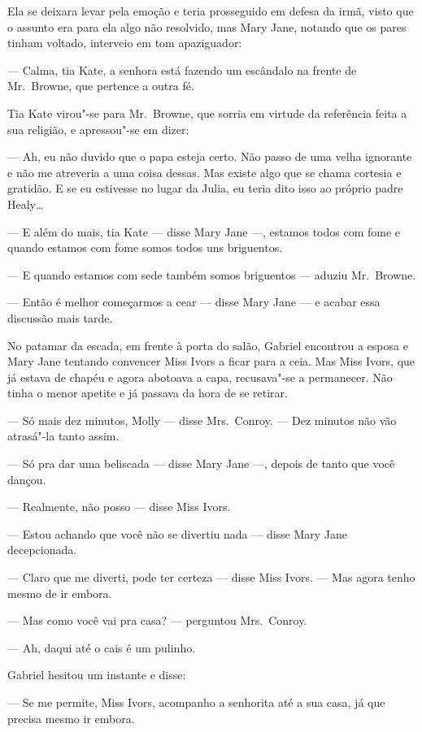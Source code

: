 Ela se deixara levar pela emoção e teria prosseguido em defesa da irmã, visto
que o assunto era para ela algo não resolvido, mas Mary Jane, notando que os
pares tinham voltado, interveio em tom apaziguador:

--- Calma, tia Kate, a senhora está fazendo um escândalo na frente de 
Mr.~Browne, que pertence a outra fé.

Tia Kate virou"-se para Mr.~Browne, que sorria em virtude da referência feita a
sua religião, e apressou"-se em dizer:

--- Ah, eu não duvido que o papa esteja certo.  Não passo de uma velha
ignorante e não me atreveria a uma coisa dessas.  Mas existe algo que se chama
cortesia e gratidão.  E se eu estivesse no lugar da Julia, eu teria dito isso
ao próprio padre Healy\ldots{}

--- E além do mais, tia Kate --- disse Mary Jane ---, estamos todos com fome e
quando estamos com fome somos todos uns briguentos.

--- E quando estamos com sede também somos briguentos --- aduziu Mr.~Browne.

--- Então é melhor começarmos a cear --- disse Mary Jane --- e acabar essa
discussão mais tarde.

No patamar da escada, em frente à porta do salão, Gabriel encontrou a esposa e
Mary Jane tentando convencer Miss Ivors a ficar para a ceia.  Mas Miss Ivors,
que já estava de chapéu e agora abotoava a capa, recusava"-se a permanecer.  Não
tinha o menor apetite e já passava da hora de se retirar.

--- Só mais dez minutos, Molly --- disse Mrs.~Conroy.  --- Dez minutos não vão
atrasá"-la tanto assim.

--- Só pra dar uma beliscada --- disse Mary Jane ---, depois de tanto que você
dançou.

--- Realmente, não posso --- disse Miss Ivors.

--- Estou achando que você não se divertiu nada --- disse Mary Jane
decepcionada.

--- Claro que me diverti, pode ter certeza --- disse Miss Ivors.  --- Mas agora
tenho mesmo de ir embora.

--- Mas como você vai pra casa? --- perguntou Mrs.~Conroy.

--- Ah, daqui até o cais é um pulinho.

Gabriel hesitou um instante e disse:

--- Se me permite, Miss Ivors, acompanho a senhorita até a sua casa, já que
precisa mesmo ir embora.

